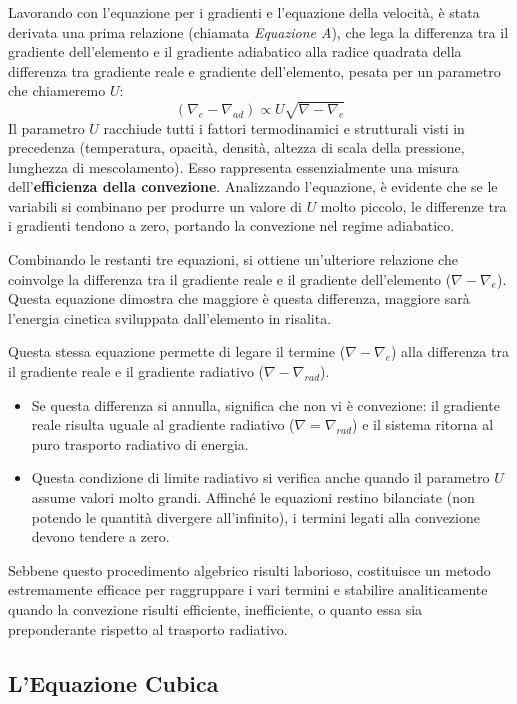 Lavorando con l'equazione per i gradienti e l'equazione della velocità, è stata derivata una prima relazione (chiamata \textit{Equazione A}), che lega la differenza tra il gradiente dell'elemento e il gradiente adiabatico alla radice quadrata della differenza tra gradiente reale e gradiente dell'elemento, pesata per un parametro che chiameremo $U$:
\begin{equation}
(\nabla_{e} - \nabla_{ad}) \propto U \sqrt{\nabla - \nabla_{e}}
\end{equation}
Il parametro $U$ racchiude tutti i fattori termodinamici e strutturali visti in precedenza (temperatura, opacità, densità, altezza di scala della pressione, lunghezza di mescolamento). Esso rappresenta essenzialmente una misura dell'\textbf{efficienza della convezione}. Analizzando l'equazione, è evidente che se le variabili si combinano per produrre un valore di $U$ molto piccolo, le differenze tra i gradienti tendono a zero, portando la convezione nel regime adiabatico.

Combinando le restanti tre equazioni, si ottiene un'ulteriore relazione che coinvolge la differenza tra il gradiente reale e il gradiente dell'elemento ($\nabla - \nabla_{e}$). Questa equazione dimostra che maggiore è questa differenza, maggiore sarà l'energia cinetica sviluppata dall'elemento in risalita.

Questa stessa equazione permette di legare il termine ($\nabla - \nabla_{e}$) alla differenza tra il gradiente reale e il gradiente radiativo ($\nabla - \nabla_{rad}$).
\begin{itemize}
\item Se questa differenza si annulla, significa che non vi è convezione: il gradiente reale risulta uguale al gradiente radiativo ($\nabla = \nabla_{rad}$) e il sistema ritorna al puro trasporto radiativo di energia.
\item Questa condizione di limite radiativo si verifica anche quando il parametro $U$ assume valori molto grandi. Affinché le equazioni restino bilanciate (non potendo le quantità divergere all'infinito), i termini legati alla convezione devono tendere a zero.
\end{itemize}
Sebbene questo procedimento algebrico risulti laborioso, costituisce un metodo estremamente efficace per raggruppare i vari termini e stabilire analiticamente quando la convezione risulti efficiente, inefficiente, o quanto essa sia preponderante rispetto al trasporto radiativo.

\subsection{L'Equazione Cubica}

